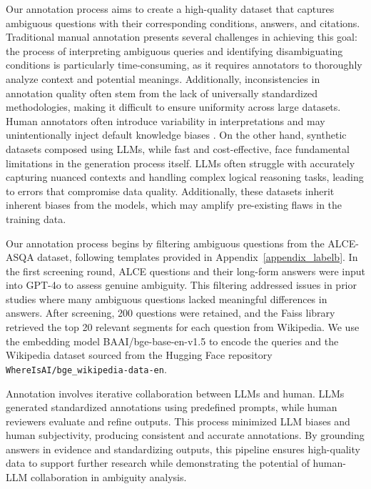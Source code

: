 Our annotation process aims to create a high-quality dataset that captures ambiguous questions with their corresponding conditions, answers, and citations. Traditional manual annotation presents several challenges in achieving this goal: the process of interpreting ambiguous queries and identifying disambiguating conditions is particularly time-consuming, as it requires annotators to thoroughly analyze context and potential meanings. Additionally, inconsistencies in annotation quality often stem from the lack of universally standardized methodologies, making it difficult to ensure uniformity across large datasets. Human annotators often introduce variability in interpretations and may unintentionally inject default knowledge biases \cite{geva2019we}. On the other hand, synthetic datasets composed using LLMs, while fast and cost-effective, face fundamental limitations in the generation process itself. LLMs often struggle with accurately capturing nuanced contexts and handling complex logical reasoning tasks, leading to errors that compromise data quality. Additionally, these datasets inherit inherent biases from the models, which may amplify pre-existing flaws in the training data. %

Our annotation process begins by filtering ambiguous questions from the ALCE-ASQA dataset, following templates provided in Appendix~\ref{appendix_labelb}. In the first screening round, ALCE questions and their long-form answers were input into GPT-4o \cite{achiam2023gpt,openai2024gpt4} to assess genuine ambiguity. This filtering addressed issues in prior studies where many ambiguous questions lacked meaningful differences in answers. After screening, 200 questions were retained, and the Faiss library retrieved the top 20 relevant segments for each question from Wikipedia. We use the embedding model BAAI/bge-base-en-v1.5 \cite{bge_embedding} to encode the queries and the Wikipedia dataset sourced from the Hugging Face repository \texttt{WhereIsAI/bge\_wikipedia-data-en}.

Annotation involves iterative collaboration between LLMs and human. LLMs generated standardized annotations using predefined prompts, while human reviewers evaluate and refine outputs. This process minimized LLM biases and human subjectivity, producing consistent and accurate annotations. By grounding answers in evidence and standardizing outputs, this pipeline ensures high-quality data to support further research while demonstrating the potential of human-LLM collaboration in ambiguity analysis.



